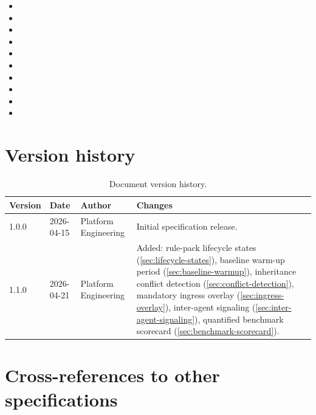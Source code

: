 \begin{itemize}
  \item {}
  \item {}
  \item {}
  \item {}
  \item {}
  \item {}
  \item {}
  \item {}
  \item {}
  \item {}
\end{itemize}

\section{Version history}
\label{sec:version-history}

\begin{table}[htbp]
\centering
\footnotesize
\caption{Document version history.}
\label{tab:version-history}
\begin{tabularx}{\textwidth}{@{}l l l X@{}}
\toprule
\textbf{Version} & \textbf{Date} & \textbf{Author} & \textbf{Changes} \\
\midrule
1.0.0 & 2026-04-15 & Platform Engineering & Initial specification release. \\
1.1.0 & 2026-04-21 & Platform Engineering & Added: rule-pack lifecycle states (\cref{sec:lifecycle-states}), baseline warm-up period (\cref{sec:baseline-warmup}), inheritance conflict detection (\cref{sec:conflict-detection}), mandatory ingress overlay (\cref{sec:ingress-overlay}), inter-agent signaling (\cref{sec:inter-agent-signaling}), quantified benchmark scorecard (\cref{sec:benchmark-scorecard}). \\
\bottomrule
\end{tabularx}
\end{table}

\section{Cross-references to other specifications}


